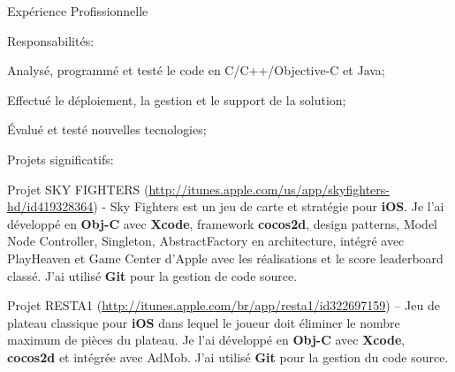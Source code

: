 \documentclass{resume}
\begin{document}
\begin{rSection}{Expérience Profissionnelle}
\begin{rSubsection}{Responsabilités:}{}{}{}
      \item Analysé, programmé et testé le code en C/C++/Objective-C et Java;
      \item Effectué le déploiement, la gestion et le support de la solution;
      \item Évalué et testé nouvelles tecnologies;
    \end{rSubsection}
    \begin{rSubsection}{Projets significatifs:}{}{}{}
      \item Projet SKY FIGHTERS (\url{http://itunes.apple.com/us/app/skyfighters-hd/id419328364}) - Sky Fighters est un jeu de carte et stratégie pour \textbf{iOS}. Je l’ai développé en \textbf{Obj-C} avec \textbf{Xcode}, framework \textbf{cocos2d}, design patterns, Model Node Controller, Singleton, AbstractFactory en architecture, intégré avec PlayHeaven et Game Center d'Apple avec les réalisations et le score leaderboard classé. J’ai utilisé \textbf{Git} pour la gestion de code source. \\
      \item Projet RESTA1 (\url{http://itunes.apple.com/br/app/resta1/id322697159}) – Jeu de plateau classique pour \textbf{iOS} dans lequel le joueur doit éliminer le nombre maximum de pièces du plateau. Je l’ai développé en \textbf{Obj-C} avec \textbf{Xcode}, \textbf{cocos2d} et intégrée avec AdMob. J’ai utilisé \textbf{Git} pour la gestion du code source.

\end{rSubsection}
\end{rSection}
\end{document}

